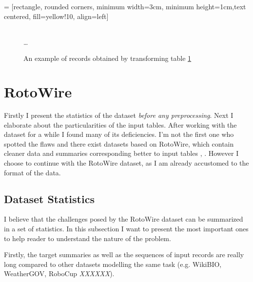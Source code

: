  = [rectangle, rounded corners, minimum width=3cm, minimum height=1cm,text centered, fill=yellow!10, align=left]

\begin{figure}[!h]
    \centering
    \usetikzlibrary{shapes.multipart}
    \\ \dots
    \caption{An example of records obtained by transforming table \ref{ex_seq_rec}} \label{ex_seq_rec}
    \end{figure}

\section{RotoWire} \label{rotowire_preproc_section}

Firstly I present the statistics of the dataset \emph{before any preprocessing}. Next I elaborate about the particularities of the input tables. After working with the dataset for a while I found many of its deficiencies. I'm not the first one who spotted the flaws and there exist datasets based on RotoWire, which contain cleaner data and summaries corresponding better to input tables \citep{wang-2019-revisiting}, \citep{thomson-2020-sportsett}. However I choose to continue with the RotoWire dataset, as I am already accustomed to the format of the data.

\subsection{Dataset Statistics} \label{assumptions_ref}

I believe that the challenges posed by the RotoWire dataset can be summarized in a set of statistics. In this subsection I want to present the most important ones to help reader to understand the nature of the problem. 

Firstly, the target summaries as well as the sequences of input records are really long compared to other datasets modelling the same task (e.g. WikiBIO, WeatherGOV, RoboCup \emph{XXXXXX}).

